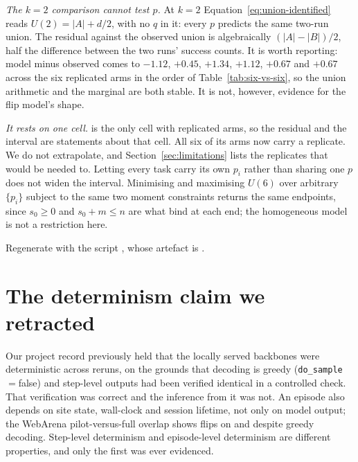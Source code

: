 \emph{The $k=2$ comparison cannot test $p$.} At $k=2$
Equation~\ref{eq:union-identified} reads $U(2) = |A| + d/2$, with no $q$ in it:
every $p$ predicts the same two-run union. The residual against the observed
union is algebraically $(|A|-|B|)/2$, half the difference between the two runs'
success counts. It is worth reporting: model minus observed comes to
$-1.12$, $+0.45$, $+1.34$, $+1.12$, $+0.67$ and $+0.67$\pp{} across the six
replicated arms in the order of Table~\ref{tab:six-vs-six}, so the union
arithmetic and the marginal are both stable. It is not, however, evidence for the
flip model's shape.

\emph{It rests on one cell.}  is the only cell with
replicated arms, so the residual and the interval are statements about that
cell. All six of its arms now carry a replicate. We do not extrapolate, and
Section~\ref{sec:limitations} lists the replicates that would be needed to.
Letting every task carry its own $p_i$ rather than sharing one $p$ does not
widen the interval. Minimising and maximising $U(6)$ over arbitrary $\{p_i\}$
subject to the same two moment constraints returns the same endpoints, since
$s_0 \ge 0$ and $s_0 + m \le n$ are what bind at each end; the homogeneous
model is not a restriction here.

Regenerate with the script
, whose artefact is
.

\section{The determinism claim we retracted}

Our project record previously held that the locally served backbones were
deterministic across reruns, on the grounds that decoding is greedy
(\texttt{do\_sample}$=$false) and step-level outputs had been verified identical
in a controlled check. That verification was correct and the inference from it
was not. An episode also depends on site state, wall-clock and session lifetime, not only on model output; the WebArena pilot-versus-full overlap shows flips on
\mVis{} and \mPP{} despite greedy decoding. Step-level determinism and
episode-level determinism are different properties, and only the first was ever
evidenced.
